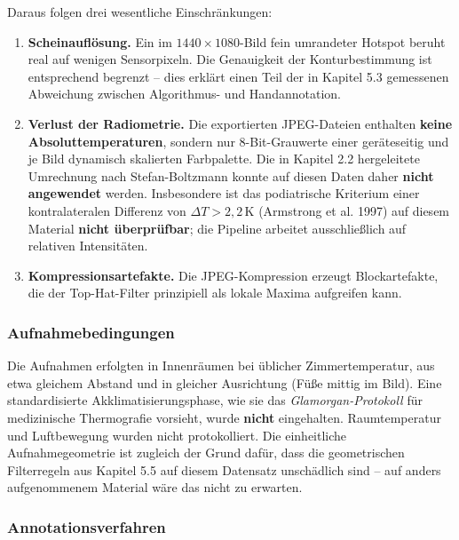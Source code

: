 \documentclass[
  11pt,
]{article}
\providecommand{\tightlist}{%
  \setlength{\itemsep}{0pt}\setlength{\parskip}{0pt}}
\begin{document}
Daraus folgen drei wesentliche Einschränkungen:

\begin{enumerate}
\def\labelenumi{\arabic{enumi}.}
\tightlist
\item
  \textbf{Scheinauflösung.} Ein im \(1440 \times 1080\)-Bild fein
  umrandeter Hotspot beruht real auf wenigen Sensorpixeln. Die
  Genauigkeit der Konturbestimmung ist entsprechend begrenzt -- dies
  erklärt einen Teil der in Kapitel 5.3 gemessenen Abweichung zwischen
  Algorithmus- und Handannotation.
\item
  \textbf{Verlust der Radiometrie.} Die exportierten JPEG-Dateien
  enthalten \textbf{keine Absoluttemperaturen}, sondern nur
  8-Bit-Grauwerte einer geräteseitig und je Bild dynamisch skalierten
  Farbpalette. Die in Kapitel 2.2 hergeleitete Umrechnung nach
  Stefan-Boltzmann konnte auf diesen Daten daher \textbf{nicht
  angewendet} werden. Insbesondere ist das podiatrische Kriterium einer
  kontralateralen Differenz von \(\Delta T > 2{,}2\,\)K (Armstrong et
  al. 1997) auf diesem Material \textbf{nicht überprüfbar}; die Pipeline
  arbeitet ausschließlich auf relativen Intensitäten.
\item
  \textbf{Kompressionsartefakte.} Die JPEG-Kompression erzeugt
  Blockartefakte, die der Top-Hat-Filter prinzipiell als lokale Maxima
  aufgreifen kann.
\end{enumerate}

\subsubsection{Aufnahmebedingungen}\label{aufnahmebedingungen}

Die Aufnahmen erfolgten in Innenräumen bei üblicher Zimmertemperatur,
aus etwa gleichem Abstand und in gleicher Ausrichtung (Füße mittig im
Bild). Eine standardisierte Akklimatisierungsphase, wie sie das
\emph{Glamorgan-Protokoll} für medizinische Thermografie vorsieht, wurde
\textbf{nicht} eingehalten. Raumtemperatur und Luftbewegung wurden nicht
protokolliert. Die einheitliche Aufnahmegeometrie ist zugleich der Grund
dafür, dass die geometrischen Filterregeln aus Kapitel 5.5 auf diesem
Datensatz unschädlich sind -- auf anders aufgenommenem Material wäre das
nicht zu erwarten.

\subsubsection{Annotationsverfahren}\label{annotationsverfahren}
\end{document}
